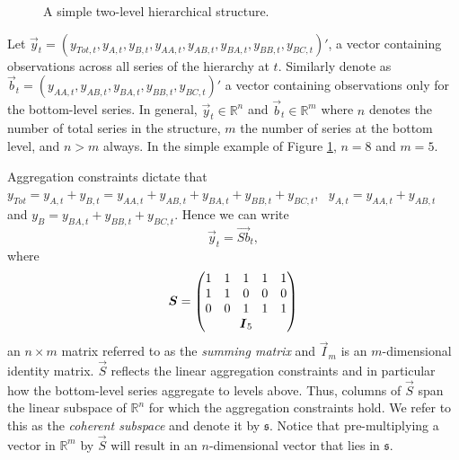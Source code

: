 \documentclass[graybox]{svmult}
\begin{document}
\begin{figure}[!hbt]  \center
  \caption{A simple two-level hierarchical structure.}
  \label{fig:simple tree}
\end{figure}

Let $\vec{y}_t = (y_{Tot,t},y_{A,t}, y_{B,t},y_{AA,t}, y_{AB,t}, y_{BA,t}, y_{BB,t},y_{BC,t})'$, a vector containing observations across all series of the hierarchy at $t$. Similarly denote as \linebreak $\vec{b}_t = (y_{AA,t}, y_{AB,t}, y_{BA,t}, y_{BB,t}, y_{BC,t})'$ a vector containing observations only for the bottom-level series. In general, $\vec{y}_t\in \mathbb{R}^n$ and $\vec{b}_t \in \mathbb{R}^m$ where $n$ denotes the number of total series in the structure, $m$ the number of series at the bottom level, and $n>m$ always. In the simple example of Figure \ref{fig:simple tree}, $n=8$ and $m=5$.

Aggregation constraints dictate that $y_{Tot}=y_{A,t}+y_{B,t}=y_{AA,t}+y_{AB,t}+y_{BA,t}+y_{BB,t}+y_{BC,t}$,~ $y_{A,t}=y_{AA,t}+y_{AB,t}$ and $y_{B}=y_{BA,t}+y_{BB,t}+y_{BC,t}$. Hence we can write
\begin{equation}\label{eq:summing matrix}
\vec{y}_t = \vec{Sb}_t,
\end{equation}
where \begin{equation*}
\vec{S} = \begin{pmatrix}
1& 1& 1& 1 & 1 \\
1& 1& 0& 0 & 0\\
0& 0& 1& 1 & 1\\
& \multicolumn{3}{c}{\vec{I}_5} &
\end{pmatrix}
\end{equation*}
an $n\times m$ matrix referred to as the \textit{summing matrix} and $\vec{I}_m$ is an $m$-dimensional identity matrix. $\vec{S}$ reflects the linear aggregation constraints and in particular how the bottom-level series aggregate to levels above. Thus, columns of $\vec{S}$ span the linear subspace of $\mathbb{R}^n$ for which the aggregation constraints hold. We refer to this as the \textit{coherent subspace} and denote it by $\mathfrak{s}$. Notice that pre-multiplying a vector in $\mathbb{R}^m$ by $\vec{S}$ will result in an $n$-dimensional vector that lies in $\mathfrak{s}$.
\end{document}
